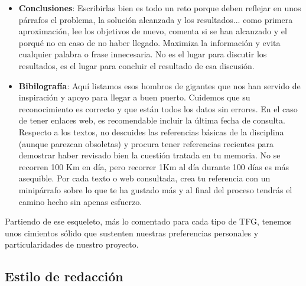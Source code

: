 {\begin{itemize}
    \item \textbf{Conclusiones}: Escribirlas bien es todo un reto porque deben reflejar en unos párrafos el problema, la solución alcanzada y los resultados... como primera aproximación, lee los objetivos de nuevo, comenta si se han alcanzado y el porqué no en caso de no haber llegado. Maximiza la información y evita cualquier palabra o frase innecesaria. No es el lugar para discutir los resultados, es el lugar para concluir el resultado de esa discusión. 

    \item \textbf{Bibilografía}: Aquí listamos esos hombros de gigantes que nos han servido de inspiración y apoyo para llegar a buen puerto. Cuidemos que su reconocimiento es correcto y que están todos los datos sin errores. En el caso de tener enlaces web, es recomendable incluir la última fecha de consulta. Respecto a los textos, no descuides las referencias básicas de la disciplina (aunque parezcan obsoletas) y procura tener referencias recientes para demostrar haber revisado bien la cuestión tratada en tu memoria. No se recorren 100 Km en día, pero recorrer 1Km al día durante 100 días es más asequible. Por cada texto o web consultada, crea tu referencia con un minipárrafo sobre lo que te ha gustado más y al final del proceso tendrás el camino hecho sin apenas esfuerzo.
    
\end{itemize}

Partiendo de ese esqueleto, más lo comentado para cada tipo de TFG, tenemos unos cimientos sólido que sustenten nuestras preferencias personales y particularidades de nuestro proyecto.

\subsection{Estilo de redacción} %



}
